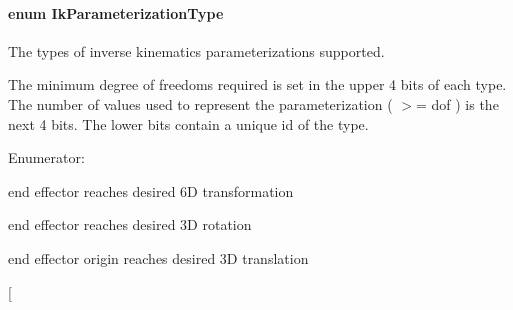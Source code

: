 \hypertarget{namespaceOpenRAVE_a16f7833e516a35d385ac594a44e44a2e}{
\paragraph[{IkParameterizationType}]{\setlength{\rightskip}{0pt plus 5cm}enum {\bf IkParameterizationType}}\hfill}
\label{namespaceOpenRAVE_a16f7833e516a35d385ac594a44e44a2e}


The types of inverse kinematics parameterizations supported. 

The minimum degree of freedoms required is set in the upper 4 bits of each type. The number of values used to represent the parameterization ( $>$= dof ) is the next 4 bits. The lower bits contain a unique id of the type. \begin{Desc}
\item[Enumerator: ]\par
\begin{description}
\item[{\em 
\hypertarget{namespaceOpenRAVE_a16f7833e516a35d385ac594a44e44a2ea33b4f04338b6d55fe993b6bdd9f66956}{
IKP\_\-Transform6D}
\label{namespaceOpenRAVE_a16f7833e516a35d385ac594a44e44a2ea33b4f04338b6d55fe993b6bdd9f66956}
}]end effector reaches desired 6D transformation \item[{\em 
\hypertarget{namespaceOpenRAVE_a16f7833e516a35d385ac594a44e44a2ea125270b64ed51a89e7021ec7e6d71669}{
IKP\_\-Rotation3D}
\label{namespaceOpenRAVE_a16f7833e516a35d385ac594a44e44a2ea125270b64ed51a89e7021ec7e6d71669}
}]end effector reaches desired 3D rotation \item[{\em 
\hypertarget{namespaceOpenRAVE_a16f7833e516a35d385ac594a44e44a2eae24724faf9388c7f2ae2c7cbbc9c5e94}{
IKP\_\-Translation3D}
\label{namespaceOpenRAVE_a16f7833e516a35d385ac594a44e44a2eae24724faf9388c7f2ae2c7cbbc9c5e94}
}]end effector origin reaches desired 3D translation \item[{\em 
}
\end{description}
\end{Desc}
